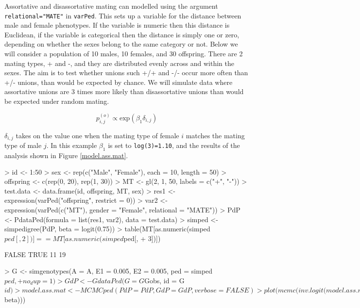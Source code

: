 \documentclass{article}
\begin{document}
Assortative and disassortative mating can modelled using the argument \texttt{relational="MATE"} in \texttt{varPed}. This sets up a variable for the distance between male and female phenotypes.  If the variable is numeric then this distance is Euclidean, if the variable is categorical then the distance is simply one or zero, depending on whether the sexes belong to the same category or not.  Below we will consider a population of 10 males, 10 females, and 30 offspring.  There are 2 mating types, + and -, and they are distributed evenly across and within the sexes.   The aim is to test whether unions such +/+ and -/- occur more often than +/- unions, than would be expected by chance.  We will simulate data where assortative unions are 3 times more likely than disassortative unions than would be expected under random mating.  

\begin{equation}
p^{(o)}_{i,j} \propto \textrm{exp}(\beta_{1}\delta_{i,j})
\label{AM-eq}
\end{equation}

$\delta_{i,j}$ takes on the value one when the mating type of female $i$ matches the mating type of male $j$. In this example $\beta_{1}$ is set to \texttt{log(3)=1.10}, and the results of the analysis shown in Figure \ref{model.ass.mat}.

\begin{Schunk}
\begin{Sinput}
> id <- 1:50
> sex <- rep(c("Male", "Female"), each = 10, length = 50)
> offspring <- c(rep(0, 20), rep(1, 30))
> MT <- gl(2, 1, 50, labels = c("+", "-"))
> test.data <- data.frame(id, offspring, MT, sex)
> res1 <- expression(varPed("offspring", restrict = 0))
> var2 <- expression(varPed(c("MT"), gender = "Female", relational = "MATE"))
> PdP <- PdataPed(formula = list(res1, var2), data = test.data)
> simped <- simpedigree(PdP, beta = logit(0.75))
> table(MT[as.numeric(simped$ped[, 2])] == MT[as.numeric(simped$ped[, 
+     3])])
\end{Sinput}
\begin{Soutput}
FALSE  TRUE 
   11    19 
\end{Soutput}
\begin{Sinput}
> G <- simgenotypes(A = A, E1 = 0.005, E2 = 0.005, ped = simped$ped, 
+     no_dup = 1)
> GdP <- GdataPed(G = G$Gobs, id = G$id)
> model.ass.mat <- MCMCped(PdP = PdP, GdP = GdP, verbose = FALSE)
> plot(mcmc(inv.logit(model.ass.mat$beta)))
\end{Sinput}
\end{Schunk}
\end{document}
